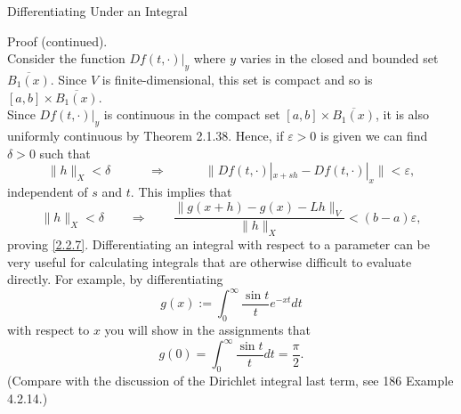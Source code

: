 \documentclass[smaller,hyperref={CJKbookmarks=true}]{beamer}
\begin{document}
\begin{frame}{Dif{}ferentiating
Under an Integral}
\begin{spacing}{1.05}
\newpage
\alert{Proof (continued).}\\
Consider the function $Df(t,\cdot)|_y$ where $y$ varies in the closed and bounded set $\overline{B_1(x)}$. Since $V$ is finite-dimensional, this set is compact and so is $[a,b]\times\overline{B_1(x)}$.\\[5pt]
Since $Df(t,\cdot)|_y$ is continuous in the compact set $[a,b]\times\overline{B_1(x)}$, it is also uniformly continuous by Theorem 2.1.38. Hence, if $\varepsilon>0$ is given we can find $\delta>0$ such that
\[\|h\|_X<\delta\qquad\quad\Rightarrow\qquad\quad\big\|Df(t,
\cdot)|_{x+sh}-Df(t,\cdot)|_x\big\|<\varepsilon,\]
independent of $s$ and $t$. This implies that
\[\|h\|_X<\delta\qquad\Rightarrow\qquad\frac{\|g(x+h)-g(x)-Lh\|_V}{\|h\|_X}
<(b-a)\varepsilon,\]
proving \eqref{2.2.7}.
\newpage
\vspace*{17pt}
Dif{}ferentiating an integral with respect to a parameter can be very useful
for calculating integrals that are otherwise dif{}ficult to evaluate directly. For
example, by dif{}ferentiating
\[g(x):=\int_{0}^{\infty}\frac{\sin t}{t}e^{-xt}dt\]
with respect to $x$ you will show in the assignments that
\[g(0)=\int_{0}^{\infty}\frac{\sin t}{t}dt=\frac{\pi}{2}.\]
(Compare with the discussion of the Dirichlet integral last term, see
186 Example 4.2.14.)
\end{spacing}
\end{frame}
\end{document}
